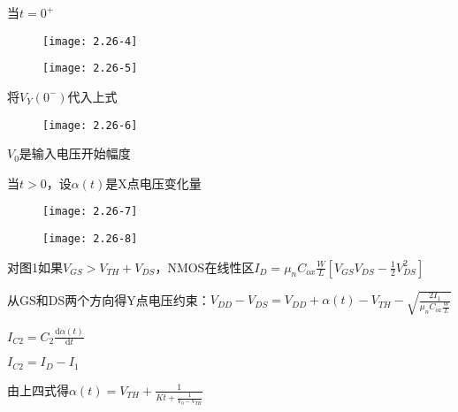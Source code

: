 当$t=0^+$

\begin{figure}[H] %
	\begin{minipage}{\linewidth}
		\texttt{[image: 2.26-4]}
	\end{minipage}
\end{figure}

\begin{figure}[H] %
	\begin{minipage}{\linewidth}
		\texttt{[image: 2.26-5]}
	\end{minipage}
\end{figure}

将$V_Y(0^-)$代入上式

\begin{figure}[H] %
	\begin{minipage}{\linewidth}
		\texttt{[image: 2.26-6]}
	\end{minipage}
\end{figure}

$V_0$是输入电压开始幅度

\scalebox{2}{（3）}

当$t>0$，设$\alpha (t)$是X点电压变化量

\begin{figure}[H] %
	\begin{minipage}{\linewidth}
		\texttt{[image: 2.26-7]}
	\end{minipage}
\end{figure}

\begin{figure}[H] %
	\begin{minipage}{\linewidth}
		\texttt{[image: 2.26-8]}
	\end{minipage}
\end{figure}

	对图1如果$V_{GS}>V_{TH}+V_{DS}$，NMOS在线性区$I_D=\mu_nC_{ox}\frac{W}{L}[V_{GS}V_{DS}-\frac{1}{2}V_{DS}^2]$
	
	从GS和DS两个方向得Y点电压约束：$V_{DD}-V_{DS}=V_{DD}+\alpha (t)-V_{TH}-\sqrt{\frac{2I_1}{\mu_nC_{ox}\frac{W}{L}}}$
	
	$I_{C2}=C_2\frac{\mathrm{d}\alpha (t)}{\mathrm{d}t}$
	
	$I_{C2}=I_D-I_1$
	
由上四式得$\alpha (t)=V_{TH}+\frac{1}{Kt+\frac{1}{V_0-V_{TH}}}$



